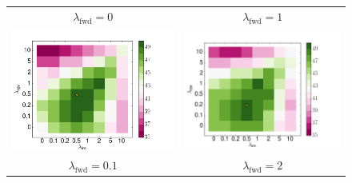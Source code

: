 \documentclass[11pt,a4paper]{article}
\begin{document}
\begin{figure}
\centering
\begin{tabular}{c c}
$\lambda_\text{fwd} = 0$ & $\lambda_\text{fwd} = 1$ \\
\includegraphics[scale=0.36]{0.png} & \includegraphics[scale=0.36]{1.png} \\
$\lambda_\text{fwd} = 0.1$ & $\lambda_\text{fwd} = 2$ \\

\end{tabular}
\end{figure}
\end{document}
